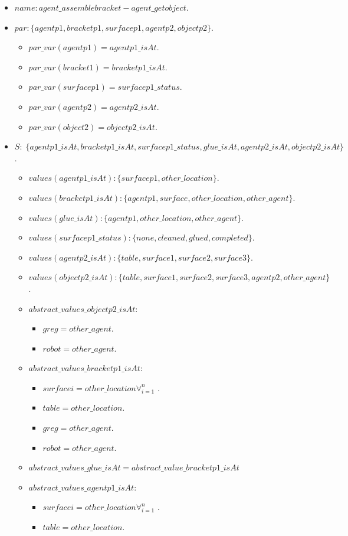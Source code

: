 \begin{itemize}
	\item $name: agent\_assemblebracket-agent\_getobject$.
	\item		$par: \{agentp1,bracketp1,surfacep1,agentp2,objectp2\}$.
		\begin{itemize}
			\item $par\_var(agentp1)=agentp1\_isAt$.
			\item $par\_var(bracket1)=bracketp1\_isAt$.
			\item $par\_var(surfacep1)=surfacep1\_status$.
			\item $par\_var(agentp2)=agentp2\_isAt$.
			\item $par\_var(object2)=objectp2\_isAt$.
		\end{itemize}

	\item $S:\;\{agentp1\_isAt, bracketp1\_isAt,surfacep1\_status, glue\_isAt, agentp2\_isAt, objectp2\_isAt\}$. 
		\begin{itemize}
			\item $values(agentp1\_isAt):\{surfacep1,other\_location\}$.
			\item $values(bracketp1\_isAt):\{agentp1,surface, other\_location,other\_agent\}$. 
			\item $values(glue\_isAt):\{agentp1,other\_location,other\_agent\}$. 
			\item $values(surfacep1\_status):\{none,cleaned,glued,completed\}$.
			\item $values(agentp2\_isAt):\{table,surface1,surface2,surface3\}$.
			\item $values(objectp2\_isAt):\{table,surface1,surface2,surface3,agentp2,other\_agent\}$. 
		\end{itemize}
		\begin{itemize}
			\item $abstract\_values\_objectp2\_isAt:$ 
				\begin{itemize}
					\item $greg=other\_agent$.
					\item $robot=other\_agent$.
				\end{itemize}	
			\item $abstract\_values\_bracketp1\_isAt:$ 
				\begin{itemize}
					\item $surfacei=other\_location \forall_{i=1}^n$ .
					\item $table=other\_location$.
					\item $greg=other\_agent$.
					\item $robot=other\_agent$.
				\end{itemize}	
			\item $abstract\_values\_glue\_isAt=abstract\_value\_bracketp1\_isAt$ 
			\item $abstract\_values\_agentp1\_isAt:$
				\begin{itemize}
					\item $surfacei=other\_location \forall_{i=1}^n$ .
					\item $table=other\_location$.
				\end{itemize}
		\end{itemize}


\end{itemize}
